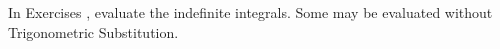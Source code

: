{\noindent In Exercises}
{,  evaluate the indefinite integrals. Some may be evaluated without Trigonometric Substitution.}
